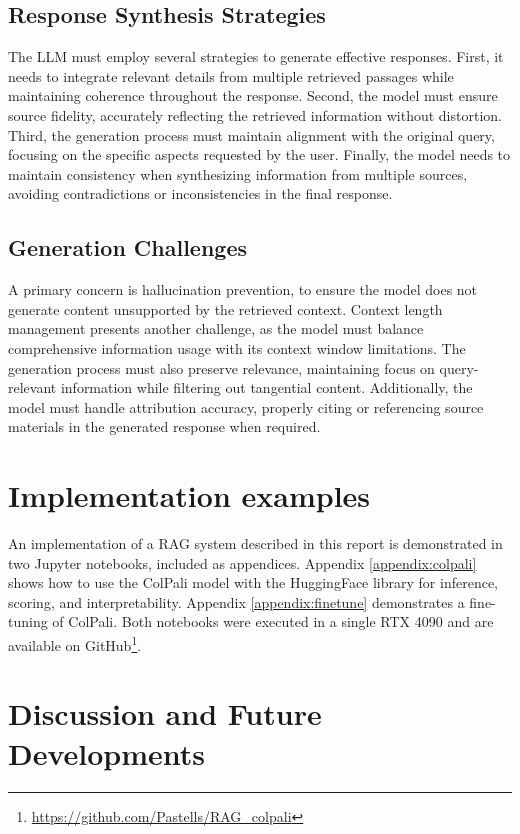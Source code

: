\documentclass[notoc, tikz]{tufte-handout}
\begin{document}
\subsection{Response Synthesis Strategies}

The LLM must employ several strategies to generate effective responses. First, it needs to integrate relevant details from multiple retrieved passages while maintaining coherence throughout the response. Second, the model must ensure source fidelity, accurately reflecting the retrieved information without distortion. Third, the generation process must maintain alignment with the original query, focusing on the specific aspects requested by the user. Finally, the model needs to maintain consistency when synthesizing information from multiple sources, avoiding contradictions or inconsistencies in the final response.

\subsection{Generation Challenges}

A primary concern is hallucination prevention, to ensure the model does not generate content unsupported by the retrieved context. Context length management presents another challenge, as the model must balance comprehensive information usage with its context window limitations. The generation process must also preserve relevance, maintaining focus on query-relevant information while filtering out tangential content. Additionally, the model must handle attribution accuracy, properly citing or referencing source materials in the generated response when required.

\section{Implementation examples}

An implementation of a RAG system described in this report is demonstrated in two Jupyter notebooks, included as appendices. Appendix \ref{appendix:colpali} shows how to use the ColPali model with the HuggingFace library for inference, scoring, and interpretability.
Appendix \ref{appendix:finetune} demonstrates a fine-tuning of ColPali.
Both notebooks were executed in a single RTX 4090 and are available on GitHub\footnote{\url{https://github.com/Pastells/RAG_colpali}}.



\section{Discussion and Future Developments}
\end{document}
